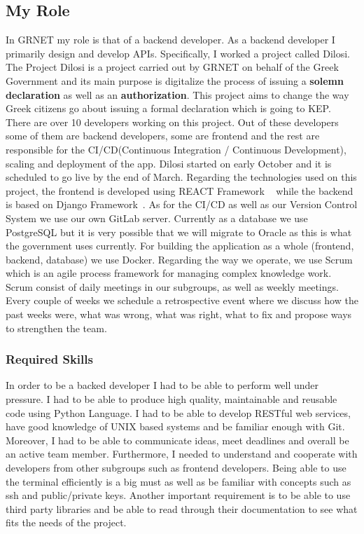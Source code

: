 \subsection{My Role}
In GRNET my role is that of a backend developer. As a backend developer I primarily design and
develop APIs. Specifically, I worked a project called Dilosi. The Project Dilosi is a project carried out by GRNET on behalf of the Greek
Government and its main purpose is digitalize the process of issuing a \textbf{solemn
declaration} as well as an \textbf{authorization}. This project aims to change the way
Greek citizens go about issuing a formal declaration which is going to KEP.
There are over 10 developers working on this project. Out of these developers some
of them are backend developers, some are frontend and the rest are responsible for the
CI/CD(Continuous Integration / Continuous Development), scaling and deployment of the app. Dilosi started on early October and it is scheduled
to go live by the end of March. Regarding the technologies used on this project, the frontend is
developed using REACT Framework ~\citep{react} while the backend is based on Django Framework~\citep{django}. As for the CI/CD as well as our Version Control System we use
our own GitLab server. Currently as a database we use PostgreSQL but it is very possible that
we will migrate to Oracle as this is what the government uses currently.
For building the application as a whole (frontend, backend, database) we
use Docker. Regarding the way we operate, we use Scrum which is an agile process
framework for managing complex knowledge work. Scrum consist of daily meetings in our subgroups,
as well as weekly meetings. Every couple of weeks we schedule a retrospective event where we discuss
how the past weeks were, what was wrong, what was right, what to fix and propose ways to strengthen
the team.

\subsubsection{Required Skills}
In order to be a backed developer I had to be able to perform well under pressure. I had to be able
to produce high quality, maintainable and reusable code using Python Language. I had to be able to develop
RESTful web services, have good knowledge of UNIX based systems and be familiar enough with Git.
Moreover, I had to be able to communicate ideas, meet deadlines and overall be an active team
member. Furthermore, I needed to understand and cooperate with developers from other subgroups
such as frontend developers. Being able to use the terminal efficiently is a big must as well as be familiar with concepts such as ssh and public/private keys. Another important requirement is to be
able to use third party libraries and be able to read through their documentation to see what fits
the needs of the project.

